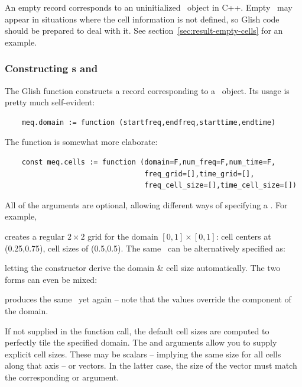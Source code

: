   An empty record corresponds to an uninitialized \Cells\ object in C++. Empty
  \Cells\ may appear in situations where the cell information is not defined,
  so Glish code should be prepared to deal with it. See
  section~\ref{sec:result-empty-cells} for an example.
  
\subsubsection{Constructing \Domain{}s and \Cells{}}

  The Glish  function constructs a record corresponding to
  a \Domain\ object. Its usage is pretty much self-evident:
  
  \begin{verbatim}
    meq.domain := function (startfreq,endfreq,starttime,endtime)
  \end{verbatim}
  
  The  function is somewhat more elaborate:
  
  \begin{verbatim}
    const meq.cells := function (domain=F,num_freq=F,num_time=F,
                                 freq_grid=[],time_grid=[],
                                 freq_cell_size=[],time_cell_size=[])
  \end{verbatim}

  All of the arguments are optional, allowing different ways of specifying 
  a \Cells. For example,
  
  
  creates a regular $2\times 2$ grid for the domain $[0,1]\times[0,1]$: cell
  centers at (0.25,0.75), cell sizes of (0.5,0.5). The same \Cells\ can be
  alternatively specified as:
  
  
  letting the constructor derive the domain \& cell size automatically. The
  two forms can even be mixed:
  
  
  produces the same \Cells\ yet again -- note that the  
  values override the  component of the domain.
  
  If not supplied in the function call, the default cell sizes are computed to
  perfectly tile the specified domain. The  and
   arguments allow you to supply explicit cell sizes.
  These may be scalars -- implying the same size for all cells along that axis
  -- or vectors. In the latter case, the size of the vector must match
  the corresponding  or  argument.

